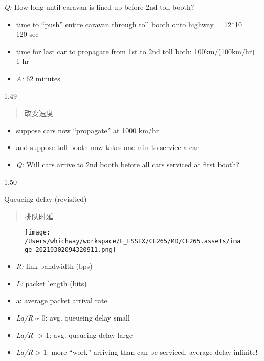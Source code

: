 \documentclass[
]{article}
\begin{document}
\emph{Q:} How long until caravan is lined up before 2nd toll booth?

\begin{itemize}
\item
  time to ``push'' entire caravan through toll booth onto highway =
  12*10 = 120 sec
\item
  time for last car to propagate from 1st to 2nd toll both:
  100km/(100km/hr)= 1 hr
\item
  \emph{A:} 62 minutes
\end{itemize}

1.49

\begin{quote}
改变速度
\end{quote}

\begin{itemize}
\item
  suppose cars now ``propagate'' at 1000 km/hr
\item
  and suppose toll booth now takes one min to service a car
\item
  \emph{Q:} Will cars arrive to 2nd booth before all cars serviced at
  first booth?
\end{itemize}

1.50

Queueing delay (revisited)

\begin{quote}
排队时延
\end{quote}

\begin{figure}
\centering
\texttt{[image: /Users/whichway/workspace/E\_ESSEX/CE265/MD/CE265.assets/image-20210302094320911.png]}
\caption{}
\end{figure}

\begin{itemize}
\item
  \emph{R:} link bandwidth (bps)
\item
  \emph{L:} packet length (bits)
\item
  a: average packet arrival rate
\end{itemize}

\begin{itemize}
\item
  \emph{La/R} \textasciitilde{} 0: avg. queueing delay small
\item
  \emph{La/R} -\textgreater{} 1: avg. queueing delay large
\item
  \emph{La/R} \textgreater{} 1: more ``work'' arriving than can be
  serviced, average delay infinite!
\end{itemize}
\end{document}
